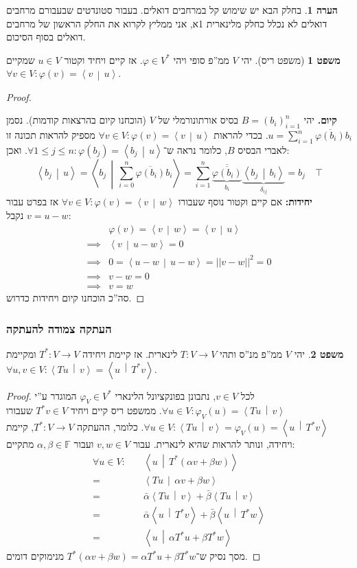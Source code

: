 \documentclass[a4paper]{article}
\newcommand\vphi  {\varphi}
\newcommand\ra    {\rangle}
\newcommand\la    {\langle}
\newcommand\ol    {\overline}
\newcommand\sumni     {\sum_{i = 0}^{n}}
\newcommand\F         {\mathbb{F}}
\newcommand\co        {\colon}
\newcommand\norm[1]   {\left \vert \left \vert #1 \right \vert \right \vert}
\newcommand\mut [2]   {\left \la #1 \,\middle|\, #2 \right \ra}
\newcommand\ag        {\alpha}
\newcommand\bg        {\beta}
\newcommand\dg        {\delta}
\renewcommand\phi     {\varphi}
\theoremstyle{definition}
\newtheorem{Theorem}{\color{myblue}משפט}
\newtheorem{Remark}{\color{mycyan}הערה}
\newcommand\theo  [1] {\begin{Theorem}#1\end{Theorem}}
\newcommand\rmark [1] {\begin{Remark}#1\end{Remark}}
\begin{document}
	\rmark{בחלק הבא יש שימוש קל במרחבים דואלים. בעבור סטונדטים שבעבורם מרחבים דואלים לא נכלל כחלק מלינארית 1א, אני ממליץ לקרוא את החלק הראשון של מרחבים דואלים בסוף הסיכום. }
	
	
	\begin{Theorem}[משפט ריס]
		יהי $V$ ממ''פ סופי ויהי $\vphi \in V^*$. אז קיים ויחיד וקטור $u \in V$ שמקיים $\forall v \in V \co \vphi(v) = \mut{v}{u}$. 
	\end{Theorem}\begin{proof}\,
		
		\textbf{קיום. }יהי $B = (b_i)_{i = 1}^{n}$ בסיס אורתונורמלי של $V$ (הוכחנו קיום בהרצאות קודמות). נסמן $u = \sum_{i =1}^{n}\ol{\phi(b_i)} b_i$. בכדי להראות $\forall v \in V \co \phi(v) = \mut{v}{u}$ מספיק להראות תכונה זו לאברי הבסיס $B$, כלומר נראה ש־$\forall 1 \le j \le n \co \phi(b_j) = \mut{b_j}{u}$. ואכן: 
		\[ \mut{b_j}{u} = \mut{b_j}{\sumni \ol{\phi(b_i)}b_i} = \sum_{i = 1}^{n}\underbrace{\ol{\ol{\phi(b_i)}}}_{b_i}\underbrace{\mut{b_j}{b_i}}_{\dg_{ij}} = b_j \quad \top \]
		\textbf{יחידות: }אם קיים וקטור נוסף שעבורו $\forall v \in V \co \phi(v) = \mut{v}{w}$ אז בפרט עבור $v = u - w$ נקבל: 
		\begin{align*}
			         &\phi(v) = \mut{v}{w} = \mut{v}{u} \\
			\implies &\mut{v}{u - w} = 0 \\ 
			\implies &0 = \mut{u - w}{u - w} = \norm{v - w}^{2} = 0 \\ 
			\implies &v - w = 0 \\
			\implies &v = w
		\end{align*}
		סה''כ הוכחנו קיום ויחידות כדרוש. 
	\end{proof}
	
	\subsubsection{העתקה צמודה להעתקה}
	\theo{יהי $V$ ממ''פ מנ''ס ותהי $T \co V \to V$ לינארית. אז קיימת ויחידה $T^* \co V \to V$ ומקיימת $\forall u ,v \in V \co \mut{Tu}{v} = \mut{u}{T^*v}$. }
	
	\begin{proof}
		לכל $v \in V$, נתבונן בפונקציונל הלינארי $\phi_V \in V^*$ המוגדר ע''י $\forall u \in V \co \phi_V(u) = \mut{Tu}{v}$. ממשפט ריס קיים ויחיד $T^*v \in V$ שעבורו $\forall u \in V \co \mut{Tu}{v} = \phi_V(u) = \mut{u}{T^*v}$. כלומר, ההעתקה $T^* \co V \to V$, קיימת ויחידה, ונותר להראות שהיא לינארית. עבור $v, w \in V$ ועבור $\ag, \bg \in \F$ מתקיים: 
		\begin{align*}
			\forall u \in V \co \quad & \mut{u}{T^* (\ag v + \bg w)} \\
			= &\mut{Tu}{\ag v + \bg w} \\
			= &\bar \ag \mut{Tu}{v} + \bar \bg \mut{Tu}{v} \\ 
			= &\bar \ag \mut{u}{T^* v} + \bar \bg \mut{u}{T^*w} \\
			= &\mut{u}{\ag T^*u + \bg T^*w}
		\end{align*}
		מסך נסיק ש־$T^*(\ag v + \bg w) = \ag T^* u + \bg T^* w$ מנימוקים דומים. 
	\end{proof}
	
\end{document}
